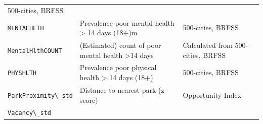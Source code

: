 \documentclass[
]{book}
\newcommand{\passthrough}[1]{#1}
\begin{document}
\begin{longtable}[]{@{}lll@{}}
\begin{minipage}[t]{0.43\columnwidth}
500-cities, BRFSS\strut
\end{minipage}\tabularnewline
\begin{minipage}[t]{0.19\columnwidth}\raggedright
\passthrough{\lstinline!MENTALHLTH!}\strut
\end{minipage} & \begin{minipage}[t]{0.29\columnwidth}\raggedright
Prevalence poor mental health \textgreater{} 14 days (18+)m\strut
\end{minipage} & \begin{minipage}[t]{0.43\columnwidth}\raggedright
500-cities, BRFSS\strut
\end{minipage}\tabularnewline
\begin{minipage}[t]{0.19\columnwidth}\raggedright
\passthrough{\lstinline!MentalHlthCOUNT!}\strut
\end{minipage} & \begin{minipage}[t]{0.29\columnwidth}\raggedright
(Estimated) count of poor mental health \textgreater14 days\strut
\end{minipage} & \begin{minipage}[t]{0.43\columnwidth}\raggedright
Calculated from 500-cities, BRFSS\strut
\end{minipage}\tabularnewline
\begin{minipage}[t]{0.19\columnwidth}\raggedright
\passthrough{\lstinline!PHYSHLTH!}\strut
\end{minipage} & \begin{minipage}[t]{0.29\columnwidth}\raggedright
Prevalence poor physical health \textgreater{} 14 days (18+)\strut
\end{minipage} & \begin{minipage}[t]{0.43\columnwidth}\raggedright
500-cities, BRFSS\strut
\end{minipage}\tabularnewline
\begin{minipage}[t]{0.19\columnwidth}\raggedright
\passthrough{\lstinline!ParkProximity\_std!}\strut
\end{minipage} & \begin{minipage}[t]{0.29\columnwidth}\raggedright
Distance to nearest park (z-score)\strut
\end{minipage} & \begin{minipage}[t]{0.43\columnwidth}\raggedright
Opportunity Index\strut
\end{minipage}\tabularnewline
\begin{minipage}[t]{0.19\columnwidth}\raggedright
\passthrough{\lstinline!Vacancy\_std!}\strut
\end{minipage} & \begin{minipage}[t]{0.29\columnwidth}\raggedright

\end{minipage}
\end{longtable}
\end{document}
